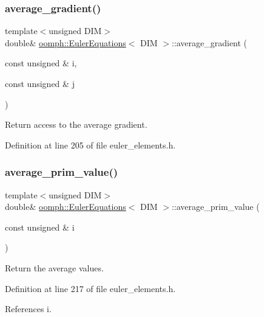 \subsubsection{\texorpdfstring{average\+\_\+gradient()}{average\_gradient()}}
{\footnotesize\ttfamily template$<$unsigned D\+IM$>$ \\
double\& \hyperlink{classoomph_1_1EulerEquations}{oomph\+::\+Euler\+Equations}$<$ D\+IM $>$\+::average\+\_\+gradient (\begin{DoxyParamCaption}\item[{const unsigned \&}]{i,  }\item[{const unsigned \&}]{j }\end{DoxyParamCaption})\hspace{0.3cm}{\ttfamily [inline]}}



Return access to the average gradient. 



Definition at line 205 of file euler\+\_\+elements.\+h.

\mbox{\label{classoomph_1_1EulerEquations_adc564d7d1f93e710167b9aa8c089da0c}} 
\subsubsection{\texorpdfstring{average\+\_\+prim\+\_\+value()}{average\_prim\_value()}}
{\footnotesize\ttfamily template$<$unsigned D\+IM$>$ \\
double\& \hyperlink{classoomph_1_1EulerEquations}{oomph\+::\+Euler\+Equations}$<$ D\+IM $>$\+::average\+\_\+prim\+\_\+value (\begin{DoxyParamCaption}\item[{const unsigned \&}]{i }\end{DoxyParamCaption})\hspace{0.3cm}{\ttfamily [inline]}}



Return the average values. 



Definition at line 217 of file euler\+\_\+elements.\+h.



References i.


